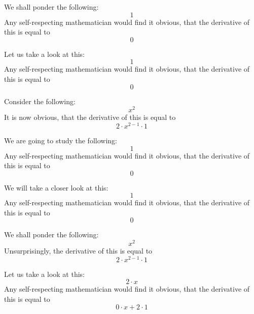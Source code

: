 \documentclass{article}
\begin{document}
We shall ponder the following:
\begin{equation}
1 
\end{equation}
Any self-respecting mathematician would find it obvious, that the derivative of this is equal to
\begin{equation}
0 
\end{equation}

Let us take a look at this:
\begin{equation}
1 
\end{equation}
Any self-respecting mathematician would find it obvious, that the derivative of this is equal to
\begin{equation}
0 
\end{equation}

Consider the following:
\begin{equation}
x ^{2 } 
\end{equation}
It is now obvious, that the derivative of this is equal to
\begin{equation}
2 \cdot x ^{2 - 1 } \cdot 1 
\end{equation}

We are going to study the following:
\begin{equation}
1 
\end{equation}
Any self-respecting mathematician would find it obvious, that the derivative of this is equal to
\begin{equation}
0 
\end{equation}

We will take a closer look at this:
\begin{equation}
1 
\end{equation}
Any self-respecting mathematician would find it obvious, that the derivative of this is equal to
\begin{equation}
0 
\end{equation}

We shall ponder the following:
\begin{equation}
x ^{2 } 
\end{equation}
Unsurprisingly, the derivative of this is equal to
\begin{equation}
2 \cdot x ^{2 - 1 } \cdot 1 
\end{equation}

Let us take a look at this:
\begin{equation}
2 \cdot x 
\end{equation}
Any self-respecting mathematician would find it obvious, that the derivative of this is equal to
\begin{equation}
0 \cdot x + 2 \cdot 1 
\end{equation}
\end{document}
